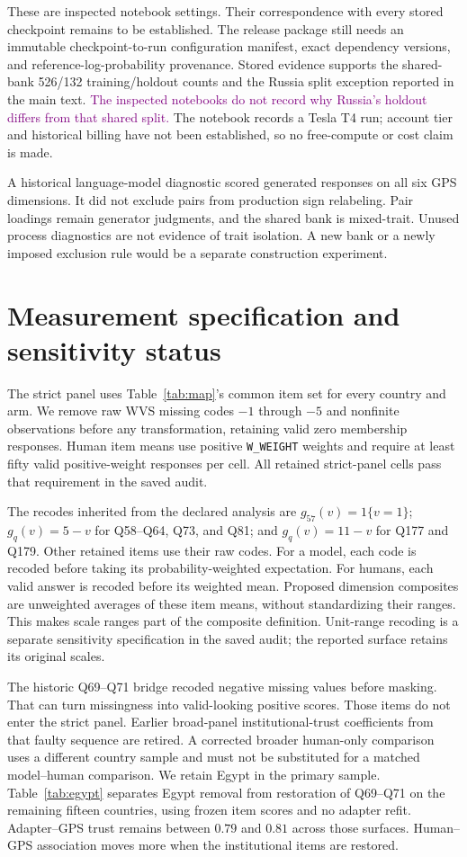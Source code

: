 These are inspected notebook settings. Their correspondence with every stored checkpoint remains to be established. The release package still needs an immutable checkpoint-to-run configuration manifest, exact dependency versions, and reference-log-probability provenance. Stored evidence supports the shared-bank 526/132 training/holdout counts and the Russia split exception reported in the main text. \textcolor{purple}{The inspected notebooks do not record why Russia's holdout differs from that shared split.} The notebook records a Tesla T4 run; account tier and historical billing have not been established, so no free-compute or cost claim is made.

A historical language-model diagnostic scored generated responses on all six GPS dimensions. It did not exclude pairs from production sign relabeling. Pair loadings remain generator judgments, and the shared bank is mixed-trait. Unused process diagnostics are not evidence of trait isolation. A new bank or a newly imposed exclusion rule would be a separate construction experiment.

\section{Measurement specification and sensitivity status}\label{app:measurement}
The strict panel uses Table~\ref{tab:map}'s common item set for every country and arm. We remove raw WVS missing codes $-1$ through $-5$ and nonfinite observations before any transformation, retaining valid zero membership responses. Human item means use positive \texttt{W\_WEIGHT} weights and require at least fifty valid positive-weight responses per cell. All retained strict-panel cells pass that requirement in the saved audit.

The recodes inherited from the declared analysis are $g_{57}(v)=1\{v=1\}$; $g_q(v)=5-v$ for Q58--Q64, Q73, and Q81; and $g_q(v)=11-v$ for Q177 and Q179. Other retained items use their raw codes. For a model, each code is recoded before taking its probability-weighted expectation. For humans, each valid answer is recoded before its weighted mean. Proposed dimension composites are unweighted averages of these item means, without standardizing their ranges. This makes scale ranges part of the composite definition. Unit-range recoding is a separate sensitivity specification in the saved audit; the reported surface retains its original scales.

The historic Q69--Q71 bridge recoded negative missing values before masking. That can turn missingness into valid-looking positive scores. Those items do not enter the strict panel. Earlier broad-panel institutional-trust coefficients from that faulty sequence are retired. A corrected broader human-only comparison uses a different country sample and must not be substituted for a matched model--human comparison. We retain Egypt in the primary sample. Table~\ref{tab:egypt} separates Egypt removal from restoration of Q69--Q71 on the remaining fifteen countries, using frozen item scores and no adapter refit. Adapter--GPS trust remains between $0.79$ and $0.81$ across those surfaces. Human--GPS association moves more when the institutional items are restored.


